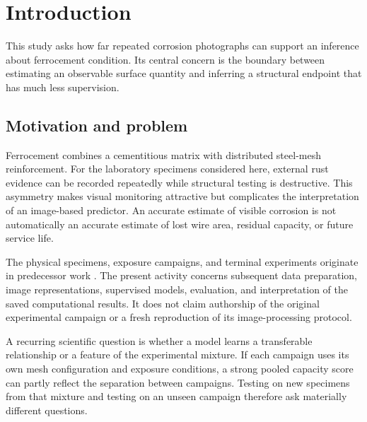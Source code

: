 \chapter{Introduction}\label{ch:introduction}
This study asks how far repeated corrosion photographs can support an inference about ferrocement condition. Its central concern is the boundary between estimating an observable surface quantity and inferring a structural endpoint that has much less supervision.

\section{Motivation and problem}
Ferrocement combines a cementitious matrix with distributed steel-mesh reinforcement. For the laboratory specimens considered here, external rust evidence can be recorded repeatedly while structural testing is destructive. This asymmetry makes visual monitoring attractive but complicates the interpretation of an image-based predictor. An accurate estimate of visible corrosion is not automatically an accurate estimate of lost wire area, residual capacity, or future service life.

The physical specimens, exposure campaigns, and terminal experiments originate in predecessor work \citep{hossain_thesis,artiste2025}. The present activity concerns subsequent data preparation, image representations, supervised models, evaluation, and interpretation of the saved computational results. It does not claim authorship of the original experimental campaign or a fresh reproduction of its image-processing protocol.

A recurring scientific question is whether a model learns a transferable relationship or a feature of the experimental mixture. If each campaign uses its own mesh configuration and exposure conditions, a strong pooled capacity score can partly reflect the separation between campaigns. Testing on new specimens from that mixture and testing on an unseen campaign therefore ask materially different questions.

